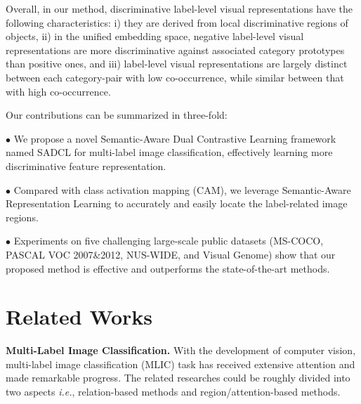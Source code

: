 \documentclass{ecai}
\def\ie{{\em i.e.}}
\begin{document}
Overall, in our method, discriminative label-level visual representations have the following characteristics:  i) they are derived from local discriminative regions of objects, ii) in the unified embedding space, negative label-level visual representations are more discriminative against associated category prototypes than positive ones, and iii) label-level visual representations are largely distinct between each category-pair with low co-occurrence, while similar between that with high co-occurrence.

Our contributions can be summarized in three-fold:

$\bullet$ We propose a novel Semantic-Aware Dual Contrastive Learning framework named SADCL for multi-label image classification, effectively learning more discriminative feature representation.

$\bullet$ Compared with class activation mapping (CAM), we leverage Semantic-Aware Representation Learning to accurately and easily locate the label-related image regions.

$\bullet$ Experiments on five challenging large-scale public datasets (MS-COCO, PASCAL VOC 2007\&2012, NUS-WIDE, and Visual Genome) show that our proposed method is effective and outperforms the state-of-the-art methods.

\vspace{-0.1cm}
\section{Related Works}
\textbf{Multi-Label Image Classification.} With the development of computer vision, multi-label image
classification (MLIC) task has received extensive attention and made remarkable progress. The related researches could be roughly divided into two aspects \ie{}, relation-based methods and region/attention-based methods.
\end{document}
